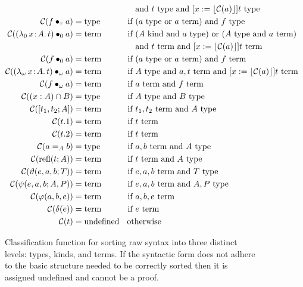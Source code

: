 \begin{figure}
\begin{align*}
            &&&\text{and } t\ptype \text{ and } [x := \ptrunc{\mathcal{C}(a)}]t\ptype \\
        \mathcal{C}(\app{f}{\tau}{a}) &=\!\! \ptype &\text{if }& (a\ptype \text{ or } a\pterm) \text{ and } f\ptype \\
        \mathcal{C}(\app{(\abs{\lambda_0}{x}{A}{t})}{0}{a}) &=\!\! \pterm &\text{if }& (A\pkind \text{ and } a\ptype) \text{ or } (A\ptype \text{ and } a\pterm) \\
            &&&\text{and } t\pterm \text{ and } [x := \ptrunc{\mathcal{C}(a)}]t\pterm \\
        \mathcal{C}(\app{f}{0}{a}) &=\!\! \pterm &\text{if }& (a\ptype \text{ or } a\pterm) \text{ and } f\pterm \\
        \mathcal{C}(\app{(\abs{\lambda_\omega}{x}{A}{t})}{\omega}{a}) &=\!\! \pterm &\text{if }& A\ptype \text{ and } a, t\pterm \text{ and } [x := \ptrunc{\mathcal{C}(a)}]t\pterm \\
        \mathcal{C}(\app{f}{\omega}{a}) &=\!\! \pterm &\text{if }& a\pterm \text{ and } f\pterm \\
        \mathcal{C}((x : A) \cap B) &=\!\! \ptype &\text{if }& A\ptype \text{ and } B\ptype \\
        \mathcal{C}([t_1, t_2; A]) &=\!\! \pterm &\text{if }& t_1, t_2\pterm \text{ and } A\ptype \\
        \mathcal{C}(t.1) &=\!\! \pterm &\text{if }& t\pterm \\
        \mathcal{C}(t.2) &=\!\! \pterm &\text{if }& t\pterm \\
        \mathcal{C}(a =_A b) &=\!\! \ptype &\text{if }& a, b\pterm \text{ and } A\ptype \\
        \mathcal{C}(\prefl(t; A)) &=\!\! \pterm &\text{if }& t\pterm \text{ and } A\ptype \\
        \mathcal{C}(\vartheta(e, a, b; T)) &=\!\! \pterm &\text{if }& e, a, b\pterm \text{ and } T\ptype \\
        \mathcal{C}(\psi(e, a, b; A, P)) &=\!\! \pterm &\text{if }& e, a, b\pterm \text{ and } A, P\ptype \\
        \mathcal{C}(\varphi(a, b, e)) &=\!\! \pterm &\text{if }& a, b, e\pterm \\
        \mathcal{C}(\delta(e)) &=\!\! \pterm &\text{if }& e\pterm \\
        \mathcal{C}(t) &= \text{undefined} &&\!\!\!\!\!\!\text{otherwise}
    \end{align*}
    \caption{
        Classification function for sorting raw syntax into three distinct levels: types, kinds, and terms.
        If the syntactic form does not adhere to the basic structure needed to be correctly sorted then it is assigned undefined and cannot be a proof.
    }
    \label{fig:2:classify}
\end{figure}
